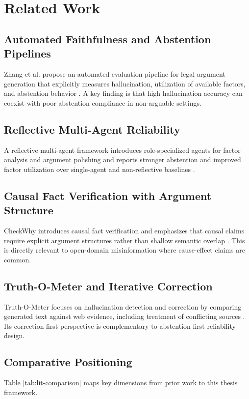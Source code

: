 \documentclass[12pt,a4paper,oneside]{report}
\begin{document}
\chapter{Related Work}
\label{chap:related}

\section{Automated Faithfulness and Abstention Pipelines}
Zhang et al. propose an automated evaluation pipeline for legal argument generation that explicitly measures hallucination, utilization of available factors, and abstention behavior \citep{zhang2025faithfulness}.
A key finding is that high hallucination accuracy can coexist with poor abstention compliance in non-arguable settings.

\section{Reflective Multi-Agent Reliability}
A reflective multi-agent framework introduces role-specialized agents for factor analysis and argument polishing and reports stronger abstention and improved factor utilization over single-agent and non-reflective baselines \citep{zhang2025reflective}.

\section{Causal Fact Verification with Argument Structure}
CheckWhy introduces causal fact verification and emphasizes that causal claims require explicit argument structures rather than shallow semantic overlap \citep{si2024checkwhy}.
This is directly relevant to open-domain misinformation where cause-effect claims are common.

\section{Truth-O-Meter and Iterative Correction}
Truth-O-Meter focuses on hallucination detection and correction by comparing generated text against web evidence, including treatment of conflicting sources \citep{galitsky2023truthometer,galitsky2023repo}.
Its correction-first perspective is complementary to abstention-first reliability design.

\section{Comparative Positioning}
Table \ref{tab:lit-comparison} maps key dimensions from prior work to this thesis framework.
\end{document}
